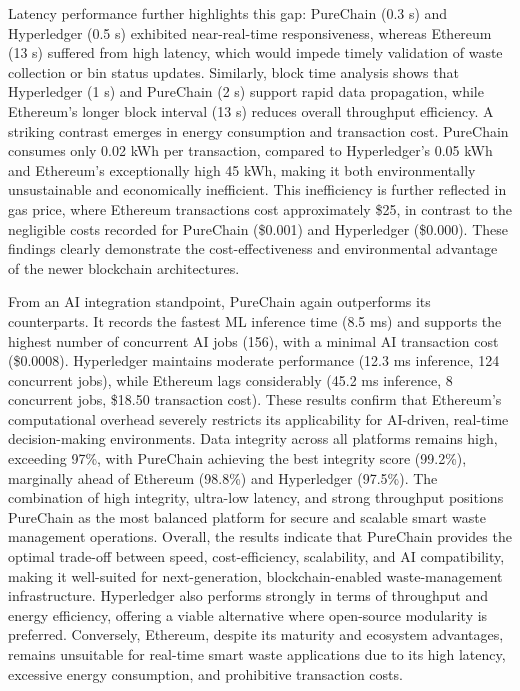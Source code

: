 \documentclass[final,5p,times,twocolumn]{elsarticle}
\begin{document}
Latency performance further highlights this gap: PureChain (0.3 s) and Hyperledger (0.5 s) exhibited near-real-time responsiveness, whereas Ethereum (13 s) suffered from high latency, which would impede timely validation of waste collection or bin status updates. Similarly, block time analysis shows that Hyperledger (1 s) and PureChain (2 s) support rapid data propagation, while Ethereum's longer block interval (13 s) reduces overall throughput efficiency. A striking contrast emerges in energy consumption and transaction cost. PureChain consumes only 0.02 kWh per transaction, compared to Hyperledger's 0.05 kWh and Ethereum's exceptionally high 45 kWh, making it both environmentally unsustainable and economically inefficient. This inefficiency is further reflected in gas price, where Ethereum transactions cost approximately \$25, in contrast to the negligible costs recorded for PureChain (\$0.001) and Hyperledger (\$0.000). These findings clearly demonstrate the cost-effectiveness and environmental advantage of the newer blockchain architectures. 

From an AI integration standpoint, PureChain again outperforms its counterparts. It records the fastest ML inference time (8.5 ms) and supports the highest number of concurrent AI jobs (156), with a minimal AI transaction cost (\$0.0008). Hyperledger maintains moderate performance (12.3 ms inference, 124 concurrent jobs), while Ethereum lags considerably (45.2 ms inference, 8 concurrent jobs, \$18.50 transaction cost). These results confirm that Ethereum's computational overhead severely restricts its applicability for AI-driven, real-time decision-making environments. Data integrity across all platforms remains high, exceeding 97\%, with PureChain achieving the best integrity score (99.2\%), marginally ahead of Ethereum (98.8\%) and Hyperledger (97.5\%). The combination of high integrity, ultra-low latency, and strong throughput positions PureChain as the most balanced platform for secure and scalable smart waste management operations. Overall, the results indicate that PureChain provides the optimal trade-off between speed, cost-efficiency, scalability, and AI compatibility, making it well-suited for next-generation, blockchain-enabled waste-management infrastructure. Hyperledger also performs strongly in terms of throughput and energy efficiency, offering a viable alternative where open-source modularity is preferred. Conversely, Ethereum, despite its maturity and ecosystem advantages, remains unsuitable for real-time smart waste applications due to its high latency, excessive energy consumption, and prohibitive transaction costs.
\end{document}

